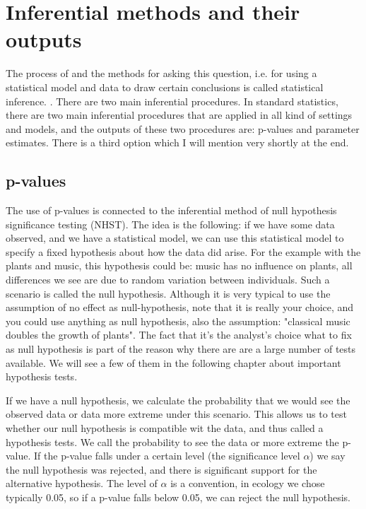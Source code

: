 \documentclass[a4paper,twoside]{tufte-book} %
\begin{document}
\section{Inferential methods and their outputs}

The process of and the methods for asking this question, i.e. for using a statistical model and data to draw certain conclusions is called statistical inference. . There are two main inferential procedures. In standard statistics, there are two main inferential procedures that are applied in all kind of settings and models, and the outputs of these two procedures are: p-values and parameter estimates. There is a third option which I will mention very shortly at the end.  

\subsection{p-values}

The use of p-values is connected to the inferential method of null hypothesis significance testing (NHST). The idea is the following: if we have some data observed, and we have a statistical model, we can use this statistical model to specify a fixed hypothesis about how the data did arise. For the example with the plants and music, this hypothesis could be: music has no influence on plants, all differences we see are due to random variation between individuals. Such a scenario is called the null hypothesis.  Although it is very typical to use the assumption of no effect as null-hypothesis, note that it is really your choice, and you could use anything as null hypothesis, also the assumption: "classical music doubles the growth of plants". The fact that it's the analyst's choice what to fix as null hypothesis is part of the reason why there are are a large number of tests available. We will see a few of them in the following chapter about important hypothesis tests.

If we have a null hypothesis, we calculate the probability that we would see the observed data or data more extreme under this scenario. This allows us to test whether our null hypothesis is compatible wit the data, and thus called a hypothesis tests. We call the probability to see the data or more extreme the p-value.  If the p-value falls under a certain level (the significance level $\alpha$) we say the null hypothesis was rejected, and there is significant support for the alternative hypothesis. The level of $\alpha$ is a convention, in ecology we chose typically 0.05, so if a p-value falls below 0.05, we can reject the null hypothesis.  
\end{document}
